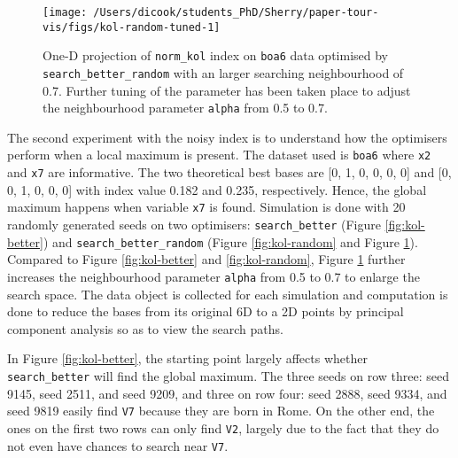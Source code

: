 \documentclass[12pt]{article}
\begin{document}
\begin{figure}

{\centering \texttt{[image: /Users/dicook/students\_PhD/Sherry/paper-tour-vis/figs/kol-random-tuned-1]} 

}

\caption{One-D projection of \texttt{norm\_kol} index on \texttt{boa6} data optimised by \texttt{search\_better\_random} with an larger searching neighbourhood of 0.7. Further tuning of the parameter has been taken place to adjust the neighbourhood parameter \texttt{alpha} from 0.5 to 0.7.}\label{fig:kol-random-tuned}
\end{figure}



The second experiment with the noisy index is to understand how the optimisers perform when a local maximum is present. The dataset used is \texttt{boa6} where \texttt{x2} and \texttt{x7} are informative. The two theoretical best bases are {[}0, 1, 0, 0, 0, 0{]} and {[}0, 0, 1, 0, 0, 0{]} with index value 0.182 and 0.235, respectively. Hence, the global maximum happens when variable \texttt{x7} is found. Simulation is done with 20 randomly generated seeds on two optimisers: \texttt{search\_better} (Figure \ref{fig:kol-better}) and \texttt{search\_better\_random} (Figure \ref{fig:kol-random} and Figure \ref{fig:kol-random-tuned}). Compared to Figure \ref{fig:kol-better} and \ref{fig:kol-random}, Figure \ref{fig:kol-random-tuned} further increases the neighbourhood parameter \texttt{alpha} from 0.5 to 0.7 to enlarge the search space. The data object is collected for each simulation and computation is done to reduce the bases from its original 6D to a 2D points by principal component analysis so as to view the search paths.

In Figure \ref{fig:kol-better}, the starting point largely affects whether \texttt{search\_better} will find the global maximum. The three seeds on row three: seed 9145, seed 2511, and seed 9209, and three on row four: seed 2888, seed 9334, and seed 9819 easily find \texttt{V7} because they are born in Rome. On the other end, the ones on the first two rows can only find \texttt{V2}, largely due to the fact that they do not even have chances to search near \texttt{V7}.
\end{document}
